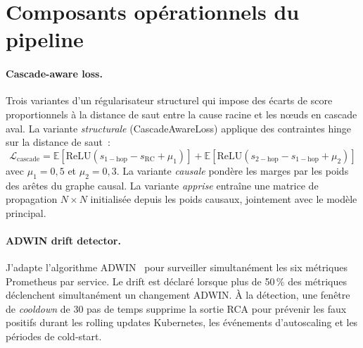 \documentclass[a4paper,11pt,oneside]{report}
\begin{document}
\section{Composants op\'erationnels du pipeline}
\label{sec:methode-ops}

\paragraph{Cascade-aware loss.} Trois variantes d'un r\'egularisateur structurel qui impose des \'ecarts de score proportionnels \`a la distance de saut entre la cause racine et les nœuds en cascade aval. La variante \emph{structurale} (CascadeAwareLoss) applique des contraintes hinge sur la distance de saut~:
\begin{equation}
  \mathcal{L}_{\mathrm{cascade}} = \mathbb{E}[\mathrm{ReLU}(s_{\mathrm{1-hop}} - s_{\mathrm{RC}} + \mu_1)] + \mathbb{E}[\mathrm{ReLU}(s_{\mathrm{2-hop}} - s_{\mathrm{1-hop}} + \mu_2)]
\end{equation}
avec $\mu_1 {=} 0{,}5$ et $\mu_2 {=} 0{,}3$. La variante \emph{causale} pond\`ere les marges par les poids des ar\^etes du graphe causal. La variante \emph{apprise} entra\^ine une matrice de propagation $N \times N$ initialis\'ee depuis les poids causaux, jointement avec le mod\`ele principal.

\paragraph{ADWIN drift detector.}
\label{sec:methode-adwin}
J'adapte l'algorithme ADWIN~\cite{bifet2007adwin} pour surveiller simultan\'ement les six m\'etriques Prometheus par service. Le drift est d\'eclar\'e lorsque plus de 50\,\% des m\'etriques d\'eclenchent simultan\'ement un changement ADWIN. \`A la d\'etection, une fen\^etre de \emph{cooldown} de 30 pas de temps supprime la sortie RCA pour pr\'evenir les faux positifs durant les rolling updates Kubernetes, les \'ev\'enements d'autoscaling et les p\'eriodes de cold-start.
\end{document}
